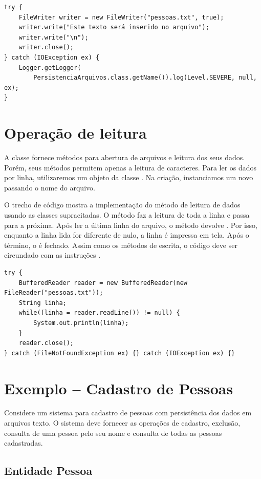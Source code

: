 \begin{verbatim}
try {
	FileWriter writer = new FileWriter("pessoas.txt", true);
	writer.write("Este texto será inserido no arquivo");
	writer.write("\n");
	writer.close();
} catch (IOException ex) {
	Logger.getLogger(
		PersistenciaArquivos.class.getName()).log(Level.SEVERE, null, ex);
}
\end{verbatim}

\section{Operação de leitura}

A classe  fornece métodos para abertura de arquivos e leitura dos seus dados. Porém, seus métodos permitem apenas a leitura de caracteres. Para ler os dados por linha, utilizaremos um objeto da classe . Na criação, instanciamos um novo  passando o nome do arquivo.

O trecho de código mostra a implementação do método de leitura de dados usando as classes supracitadas. O método  faz a leitura de toda a linha e passa para a próxima. Após ler a última linha do arquivo, o método devolve . Por isso, enquanto a linha lida for diferente de nulo, a linha é impressa em tela. Após o término, o  é fechado. Assim como os métodos de escrita, o código deve ser circundado com as instruções .

\begin{verbatim}
try {
	BufferedReader reader = new BufferedReader(new FileReader("pessoas.txt"));
	String linha;
	while((linha = reader.readLine()) != null) {
		System.out.println(linha);
	}
	reader.close();
} catch (FileNotFoundException ex) {} catch (IOException ex) {}
\end{verbatim}


\section{Exemplo -- Cadastro de Pessoas}

Considere um sistema para cadastro de pessoas com persistência dos dados em arquivos texto. O sistema deve fornecer as operações de cadastro, exclusão, consulta de uma pessoa pelo seu nome e consulta de todas as pessoas cadastradas.

\subsection{Entidade Pessoa}

